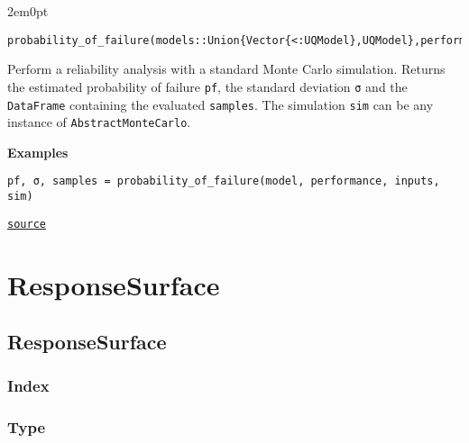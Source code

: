 \begin{adjustwidth}{2em}{0pt}


\begin{verbatim}
probability_of_failure(models::Union{Vector{<:UQModel},UQModel},performance::Function),inputs::Union{Vector{<:UQInput},UQInput},sim::AbstractMonteCarlo)
\end{verbatim}

Perform a reliability analysis with a standard Monte Carlo simulation. Returns the estimated probability of failure \texttt{pf}, the standard deviation \texttt{σ} and the \texttt{DataFrame} containing the evaluated \texttt{samples}. The simulation \texttt{sim} can be any instance of \texttt{AbstractMonteCarlo}.

\textbf{Examples}


\begin{verbatim}
pf, σ, samples = probability_of_failure(model, performance, inputs, sim)
\end{verbatim}



\href{https://github.com/friesischscott/UncertaintyQuantification.jl/blob/f5ee6cce729f0d6a57979257379c942cdf42f86f/src/reliability/probabilityoffailure.jl#L1-L12}{\texttt{source}}


\end{adjustwidth}

\chapter{ResponseSurface}


\section{ResponseSurface}



\label{4297740406374411039}{}


\subsection{Index}



\label{6663683553518785561}{}



\subsection{Type}



